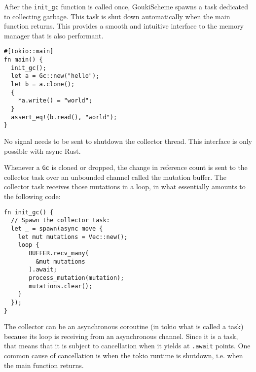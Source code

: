 \documentclass[sigplan,authordraft]{acmart}
\begin{document}
After the \texttt{init\_gc} function is called once, GoukiScheme spawns a task
dedicated to collecting garbage. This task is shut down automatically when the
main function returns. This provides a smooth and intuitive interface to the
memory manager that is also performant.

\begin{verbatim}
#[tokio::main]
fn main() {
  init_gc();
  let a = Gc::new("hello");
  let b = a.clone();
  {
    *a.write() = "world";
  }
  assert_eq!(b.read(), "world");
}
\end{verbatim}

No signal needs to be sent to shutdown the collector thread. This interface is
only possible with async Rust.

Whenever a \texttt{Gc} is cloned or dropped, the change in reference count is
sent to the collector task over an unbounded channel called the mutation buffer.
The collector task receives those mutations in a loop, in what essentially amounts
to the following code:

\begin{verbatim}
fn init_gc() {
  // Spawn the collector task:
  let _ = spawn(async move {
    let mut mutations = Vec::new();
    loop {
       BUFFER.recv_many(
         &mut mutations
       ).await;
       process_mutation(mutation);
       mutations.clear();
    } 
  });
}  
\end{verbatim}

The collector can be an asynchronous coroutine (in tokio what is called a task)
because its loop is receiving from an asynchronous channel. Since it is a task,
that means that it is subject to cancellation when it yields at \texttt{.await}
points. One common cause of cancellation is when the tokio runtime is shutdown,
i.e. when the main function returns. 



\end{document}
